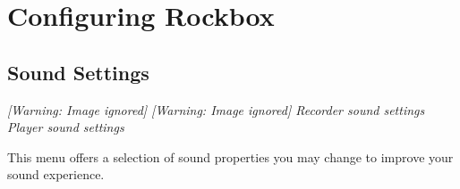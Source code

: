 \chapter{Configuring Rockbox}
\newpage

\section{Sound Settings}
{\centering\itshape
  [Warning: Image ignored] %
 \textmd{  }  [Warning: Image ignored]
 \newline
Recorder sound settings  Player sound settings  
\par}

This menu offers a selection of sound properties you may change to
improve your sound experience.

